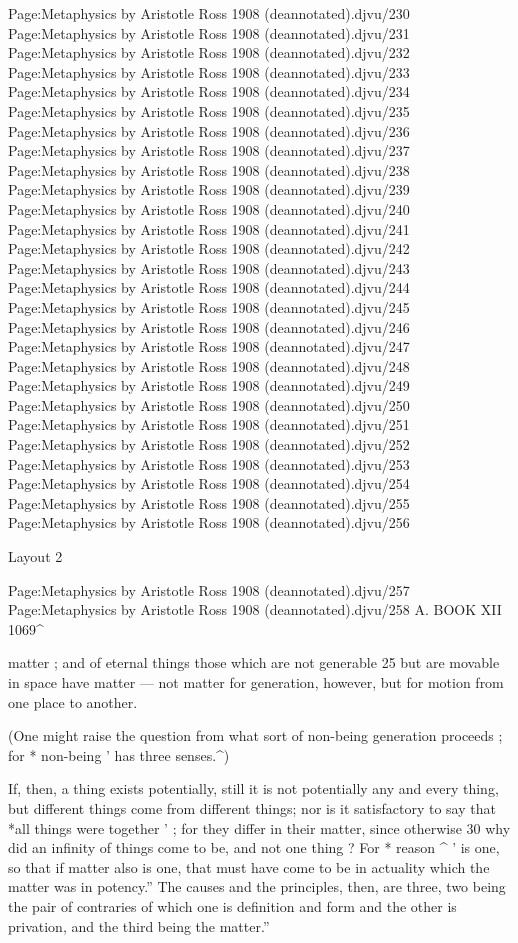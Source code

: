 Page:Metaphysics by Aristotle Ross 1908 (deannotated).djvu/230 Page:Metaphysics by Aristotle Ross 1908 (deannotated).djvu/231 Page:Metaphysics by Aristotle Ross 1908 (deannotated).djvu/232 Page:Metaphysics by Aristotle Ross 1908 (deannotated).djvu/233 Page:Metaphysics by Aristotle Ross 1908 (deannotated).djvu/234 Page:Metaphysics by Aristotle Ross 1908 (deannotated).djvu/235 Page:Metaphysics by Aristotle Ross 1908 (deannotated).djvu/236 Page:Metaphysics by Aristotle Ross 1908 (deannotated).djvu/237 Page:Metaphysics by Aristotle Ross 1908 (deannotated).djvu/238 Page:Metaphysics by Aristotle Ross 1908 (deannotated).djvu/239 Page:Metaphysics by Aristotle Ross 1908 (deannotated).djvu/240 Page:Metaphysics by Aristotle Ross 1908 (deannotated).djvu/241 Page:Metaphysics by Aristotle Ross 1908 (deannotated).djvu/242 Page:Metaphysics by Aristotle Ross 1908 (deannotated).djvu/243 Page:Metaphysics by Aristotle Ross 1908 (deannotated).djvu/244 Page:Metaphysics by Aristotle Ross 1908 (deannotated).djvu/245 Page:Metaphysics by Aristotle Ross 1908 (deannotated).djvu/246 Page:Metaphysics by Aristotle Ross 1908 (deannotated).djvu/247 Page:Metaphysics by Aristotle Ross 1908 (deannotated).djvu/248 Page:Metaphysics by Aristotle Ross 1908 (deannotated).djvu/249 Page:Metaphysics by Aristotle Ross 1908 (deannotated).djvu/250 Page:Metaphysics by Aristotle Ross 1908 (deannotated).djvu/251 Page:Metaphysics by Aristotle Ross 1908 (deannotated).djvu/252 Page:Metaphysics by Aristotle Ross 1908 (deannotated).djvu/253 Page:Metaphysics by Aristotle Ross 1908 (deannotated).djvu/254 Page:Metaphysics by Aristotle Ross 1908 (deannotated).djvu/255 Page:Metaphysics by Aristotle Ross 1908 (deannotated).djvu/256


Layout 2

Page:Metaphysics by Aristotle Ross 1908 (deannotated).djvu/257 Page:Metaphysics by Aristotle Ross 1908 (deannotated).djvu/258 A. BOOK XII 1069\textasciicircum{}

matter ; and of eternal things those which are not generable 25
but are movable in space have matter — not matter for
generation, however, but for motion from one place to
another.

(One might raise the question from what sort of non-being
generation proceeds ; for * non-being ' has three senses.\textasciicircum{})

If, then, a thing exists potentially, still it is not potentially
any and every thing, but different things come from different
things; nor is it satisfactory to say that *all things were
together ' ; for they differ in their matter, since otherwise 30
why did an infinity of things come to be, and not one thing ?
For * reason \textasciicircum{} ' is one, so that if matter also is one, that must
have come to be in actuality which the matter was in
potency.'' The causes and the principles, then, are three, two
being the pair of contraries of which one is definition and
form and the other is privation, and the third being the
matter.''


